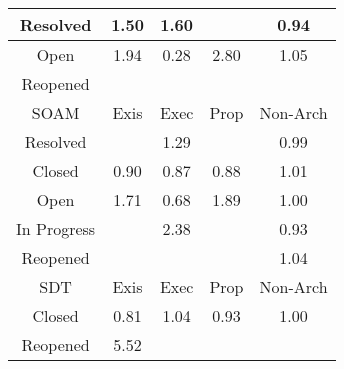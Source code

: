 \begin{tabular}{|c||c|c|c|c|}
\hline
Resolved & \cellcolor[rgb]{0.8854142410843147,0.8283541141978332,0.42} 1.50 & \cellcolor[rgb]{0.8803910368224575,0.8259747016527429,0.42} 1.60 &  & \cellcolor[rgb]{0.8996609842401856,0.7910619920702117,0.4103502519575065} 0.94 \\ 
\hline
Open & \cellcolor[rgb]{0.8637591829860999,0.8180964550986789,0.42} 1.94 & \cellcolor[rgb]{0.7777571870317287,0.21405068528351542,0.29657337456294675} 0.28 & \cellcolor[rgb]{0.8216162433270141,0.7981340099970067,0.42} 2.80 & \cellcolor[rgb]{0.9074340668920019,0.8387845580014746,0.42} 1.05 \\ 
\hline
Reopened &  &  &  &  \\ 
\hline
\hline
SOAM & Exis & Exec & Prop & Non-Arch \\ 
\hline
Resolved &  & \cellcolor[rgb]{0.895798609184952,0.8332730254033983,0.42} 1.29 &  & \cellcolor[rgb]{0.9076119121536197,0.8286963841938001,0.4177711180100451} 0.99 \\ 
\hline
Closed & \cellcolor[rgb]{0.8920907842336739,0.7552297120393898,0.40328473195142894} 0.90 & \cellcolor[rgb]{0.8863299514012054,0.7279617699657052,0.397907954641125} 0.87 & \cellcolor[rgb]{0.8876117103433446,0.734028762291831,0.3991042629871216} 0.88 & \cellcolor[rgb]{0.9096550833294319,0.8398366184192047,0.42} 1.01 \\ 
\hline
Open & \cellcolor[rgb]{0.8749395239154468,0.8233924060652116,0.42} 1.71 & \cellcolor[rgb]{0.8520019928556071,0.5654760995165398,0.3658685266652332} 0.68 & \cellcolor[rgb]{0.8662136283717484,0.8192590871234597,0.42} 1.89 & \cellcolor[rgb]{0.9097574178928222,0.8398850926860737,0.42} 1.00 \\ 
\hline
In Progress &  & \cellcolor[rgb]{0.8423209068953688,0.8079414822135957,0.42000000000000004} 2.38 &  & \cellcolor[rgb]{0.8964649941148568,0.7759343054769883,0.40736732784053287} 0.93 \\ 
\hline
Reopened &  &  &  & \cellcolor[rgb]{0.908277680809074,0.8391841645937719,0.42} 1.04 \\ 
\hline
\hline
SDT & Exis & Exec & Prop & Non-Arch \\ 
\hline
Closed & \cellcolor[rgb]{0.8746877630806452,0.6728554119150544,0.3870419122086023} 0.81 & \cellcolor[rgb]{0.9081835100818474,0.8391395574071908,0.42} 1.04 & \cellcolor[rgb]{0.8969158320878978,0.7780682718827161,0.40778810994870457} 0.93 & \cellcolor[rgb]{0.9099020842616725,0.8395365321719163,0.4199086119775609} 1.00 \\ 
\hline
Reopened & \cellcolor[rgb]{0.6878935466650588,0.7347916799992384,0.42} 5.52 &  &  &  \\ 

\end{tabular}
